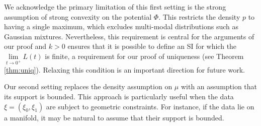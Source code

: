 \begin{remarkbox}
  \begin{remark}
    We acknowledge the primary limitation of this first setting is the strong assumption of strong convexity on the potential \(\Phi\). This restricts the density \(p\) to having a single maximum, which excludes multi-modal distributions such as Gaussian mixtures. Nevertheless, this requirement is central for the arguments of our proof and \(k > 0\) ensures that it is possible to define an SI for which the \(\lim\limits_{t \to 0^{+}} L(t) \) is finite, a requirement for our proof of uniqueness (see Theorem \ref{thm:uniq}). Relaxing this condition is an important direction for future work.
  \end{remark}
\end{remarkbox}

Our second setting replaces the density assumption on \(\mu\) with an assumption that its support is bounded. This approach is particularly useful when the data \(\xi = (\xi_{0}, \xi_{1})\) are subject to geometric constraints. For instance, if the data lie on a manifold, it may be natural to assume that their support is bounded.







